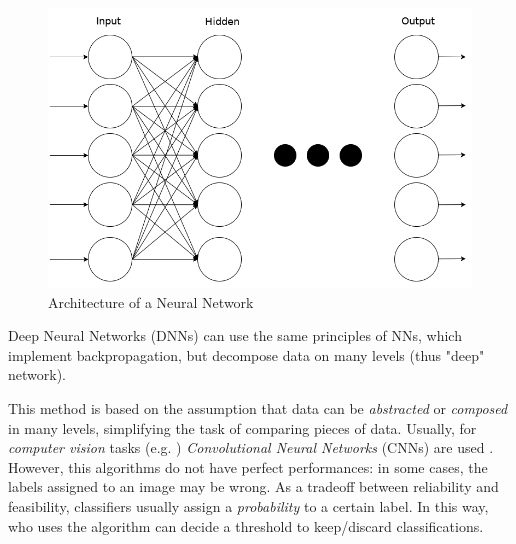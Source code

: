 \begin{figure}[htpb]
\centering
    \includegraphics[scale=0.28]{../img/nn}
    \caption{Architecture of a Neural Network}
    \label{fig:nn}
\end{figure}

Deep Neural Networks (DNNs) can use the same principles of NNs, which implement 
backpropagation, but decompose data on many levels (thus "deep" network).

This method is based on the assumption that data can be \textit{abstracted} or 
\textit{composed} in many levels, simplifying the task of comparing pieces of 
data.
Usually, for \textit{computer vision} tasks (e.g. \cite{Handwritten}) 
\textit{Convolutional Neural Networks} (CNNs) are used \cite{CNN}.
However, this algorithms do not have perfect performances: in some cases, the 
labels assigned to an image may be wrong. As a tradeoff between reliability and 
feasibility, classifiers usually assign a \textit{probability} to a certain 
label. 
In this way, who uses the algorithm can decide a threshold to keep/discard 
classifications. 